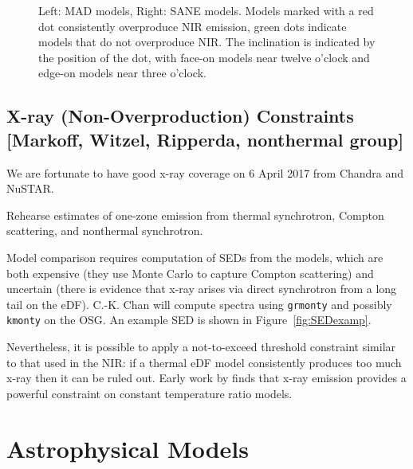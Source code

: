 \documentclass[twocolumn,tighten,dvipsnames,linenumbers]{aastex63}
\begin{document}
\begin{figure}
  \caption{Left: MAD models, Right: SANE models.  Models marked with a red dot consistently overproduce NIR emission, green dots indicate models that do not overproduce NIR.  The inclination is indicated by the position of the dot, with face-on models near twelve o'clock and edge-on models near three o'clock.}
  \label{fig:NIRmodels}
\end{figure}

\subsection{X-ray (Non-Overproduction) Constraints
  [Markoff, Witzel, Ripperda, nonthermal group]}
\label{sec:xrayconst}

We are fortunate to have good x-ray coverage on 6 April 2017 from Chandra and NuSTAR.

Rehearse estimates of one-zone emission from thermal synchrotron, Compton scattering, and nonthermal synchrotron.

Model comparison requires computation of SEDs from the models, which are both expensive (they use Monte Carlo to capture Compton scattering) and uncertain (there is evidence that x-ray arises via direct synchrotron from a long tail on the eDF).  C.-K. Chan will compute spectra using {\tt grmonty} and possibly {\tt kmonty} on the OSG.  An example SED is shown in Figure~\ref{fig:SEDexamp}.


Nevertheless, it is possible to apply a not-to-exceed threshold constraint similar to that used in the NIR: if a thermal eDF model consistently produces too much x-ray then it can be ruled out.  Early work by \citet{2009ApJ...706..497M} finds that x-ray emission provides a powerful constraint on constant temperature ratio models.

\section{Astrophysical Models}
\end{document}
